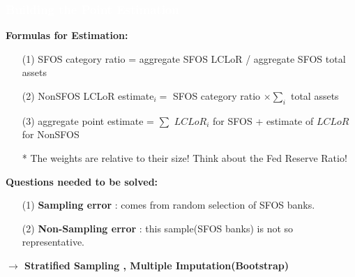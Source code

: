\documentclass{beamer}	%
\theoremstyle{plain}
\theoremstyle{definition}
\theoremstyle{remark}
\numberwithin{equation}{section}
\begin{document}
\begin{frame}
\frametitle{\textcolor{white}{Building the Point Estimation}}
\small
\textbf{Formulas for Estimation:}
\begin{itemize}
	\scriptsize
	\item[(1)] SFOS category ratio = aggregate SFOS LCLoR / aggregate SFOS total assets
	\item[(2)]
	NonSFOS LCLoR estimate$_{i}=$ SFOS category ratio $\times \sum_{i}$ total 	assets\\
	\item[(3)]aggregate point estimate = $\sum$ $LCLoR_i$ for SFOS + estimate of 	$LCLoR$ for NonSFOS
	\item[*]The weights are relative to their size! Think about the Fed Reserve Ratio!
\end{itemize}

\vbox{}

\textbf{Questions needed to be solved:}
\begin{itemize}
	\scriptsize
	\item[(1)]\textbf{Sampling error} : comes from random selection of SFOS banks. 
	\item[(2)]\textbf{Non-Sampling error} : this sample(SFOS banks) is not so representative.
\end{itemize}

\vbox{}
\textbf{$\to$ Stratified Sampling , Multiple Imputation(Bootstrap)}

\end{frame}
\end{document}

